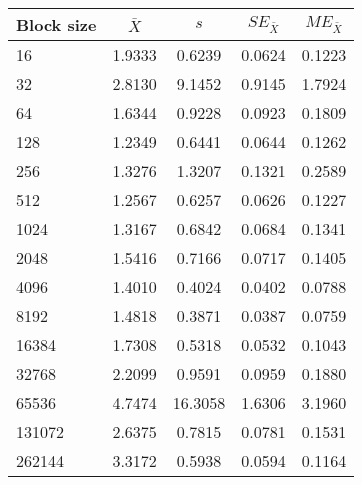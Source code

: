 \begin{tabular}{lcccc}\toprule
{\small Block size} & $\bar{X}$ & $s$ & $SE_{\bar{X}}$ & $ME_{\bar{X}}$ \\\midrule
16 & 1.9333 & 0.6239 & 0.0624 & 0.1223\\
32 & 2.8130 & 9.1452 & 0.9145 & 1.7924\\
64 & 1.6344 & 0.9228 & 0.0923 & 0.1809\\
128 & 1.2349 & 0.6441 & 0.0644 & 0.1262\\
256 & 1.3276 & 1.3207 & 0.1321 & 0.2589\\
512 & 1.2567 & 0.6257 & 0.0626 & 0.1227\\
1024 & 1.3167 & 0.6842 & 0.0684 & 0.1341\\
2048 & 1.5416 & 0.7166 & 0.0717 & 0.1405\\
4096 & 1.4010 & 0.4024 & 0.0402 & 0.0788\\
8192 & 1.4818 & 0.3871 & 0.0387 & 0.0759\\
16384 & 1.7308 & 0.5318 & 0.0532 & 0.1043\\
32768 & 2.2099 & 0.9591 & 0.0959 & 0.1880\\
65536 & 4.7474 & 16.3058 & 1.6306 & 3.1960\\
131072 & 2.6375 & 0.7815 & 0.0781 & 0.1531\\
262144 & 3.3172 & 0.5938 & 0.0594 & 0.1164\\
\bottomrule
\end{tabular}
